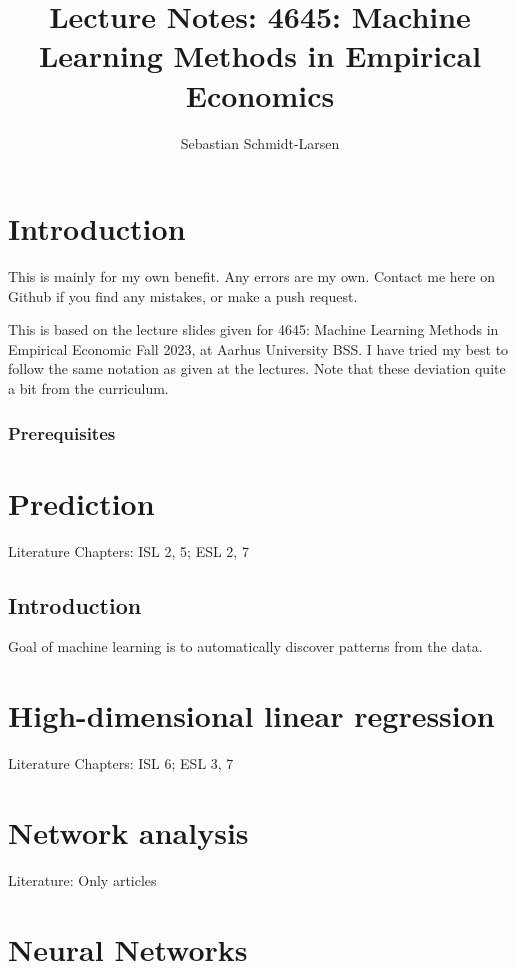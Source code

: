 \documentclass[11pt,a4paper]{article}
\begin{document}
 

\title{Lecture Notes: 4645: Machine Learning Methods in Empirical Economics}
\author{Sebastian Schmidt-Larsen}
\maketitle

\section{Introduction}

This is mainly for my own benefit. Any errors are my own. Contact me here on Github if you find any mistakes, or make a push request.

This is based on the lecture slides given for 4645: Machine Learning Methods in Empirical Economic Fall 2023, at Aarhus University BSS.
I have tried my best to follow the same notation as given at the lectures. Note that these deviation quite a bit from the curriculum.

\subsubsection*{Prerequisites}

\section{Prediction}

Literature Chapters: ISL 2, 5; ESL 2, 7

\subsection{Introduction}

Goal of machine learning is to automatically discover patterns from the data.

\section{High-dimensional linear regression}
Literature Chapters: ISL 6; ESL 3, 7

\section{Network analysis}

Literature: Only articles

\section{Neural Networks}
\end{document}
